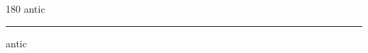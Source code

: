 
\begin{frame}
\begin{center}
\begin{turn}{180}
{\fontsize{2.5cm}{1em}\selectfont antic}
\end{turn}
\vspace{1em}\par  
\hrule
\vspace{1em}\par  
{\fontsize{2.5cm}{1em}\selectfont antic}
\end{center}
\end{frame}
